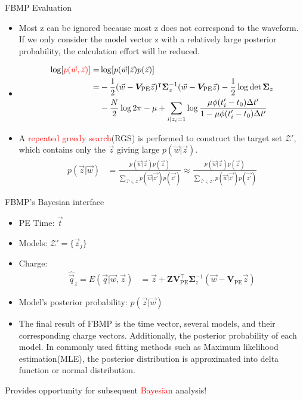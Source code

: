 \documentclass[final]{beamer}
\newlength{\colwidth}
\begin{document}
\begin{frame}[t]
\begin{columns}[t]
\begin{column}{\colwidth}
\begin{block}{FBMP Evaluation}
    \begin{itemize}
      \item Most z can be ignored because most z does not correspond to the waveform. If we only consider the model vector z with a relatively large posterior probability, the calculation effort will be reduced. 
      \item \begin{align*}
          \log[\textcolor{red}{p(\vec{w},\vec{z})}] =& \log[p(\vec{w}|\vec{z})p(\vec{z})] \\
          =& -\frac{1}{2}(\vec{w}-\bm{V}_\mathrm{PE}\vec{z})^\intercal\bm{\Sigma}_z^{-1}(\vec{w}-\bm{V}_\mathrm{PE}\vec{z})-\frac{1}{2}\log\det\bm{\Sigma}_z \\ 
          &-\frac{N}{2}\log2\pi -\mu + \sum_{i|z_i=1}\log \frac{\mu \phi(t'_i - t_0) \Delta t'}{1-\mu \phi(t'_i - t_0) \Delta t'}
          \end{align*}
      \item A \textcolor{red}{repeated greedy search}(RGS) is performed to construct the target set $\mathcal{Z}'$, which contains only the $\vec{z}$ giving large $p(\vec{w}|\vec{z})$. 
      \begin{align*}
        p(\vec{z}|\vec{w}) &= \frac{p(\vec{w}|\vec{z})p(\vec{z})}{\sum_{\vec{z}'\in\mathcal{Z}}p(\vec{w}|\vec{z'})p(\vec{z'})} \approx \frac{p(\vec{w}|\vec{z})p(\vec{z})}{\sum_{\vec{z}'\in\mathcal{Z}'}p(\vec{w}|\vec{z'})p(\vec{z'})}
      \end{align*}
    \end{itemize}

  \end{block}

  \begin{block}{FBMP's Bayesian interface}

    \begin{itemize}
      \item PE Time: $\vec{t}$
      \item Models: $\mathcal{Z}'=\{\vec{z}_j\}$
      \item Charge: \begin{align*}
          \hat{\vec{q}}_z = E(\vec{q}|\vec{w},\vec{z}) &= \vec{z} + \bm{Z}\bm{V}_\mathrm{PE}^\intercal\bm{\Sigma}_z^{-1}(\vec{w}-\bm{V}_\mathrm{PE}\vec{z})
          \end{align*}
      \item Model's posterior probability: $p(\vec{z}|\vec{w})$
      \item The final result of FBMP is the time vector, several models, and their corresponding charge vectors. Additionally, the posterior probability of each model. In commonly used fitting methods such as Maximum likelihood estimation(MLE), the posterior distribution is approximated into delta function or normal distribution. 
    \end{itemize}
    \begin{center}
        Provides opportunity for subsequent \textcolor{red}{Bayesian} analysis! 
    \end{center}


\end{block}
\end{column}
\end{columns}
\end{frame}
\end{document}
